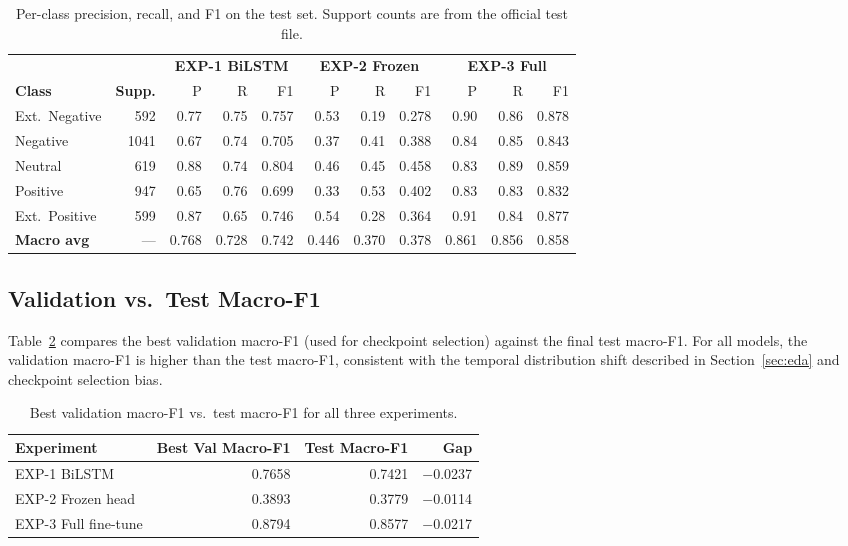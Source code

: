 \begin{table}[H]
    \centering
    \caption{Per-class precision, recall, and F1 on the test set. Support counts are from the official test file.}
    \label{tab:perclass_results}
    \begin{tabularx}{\textwidth}{l r | r r r | r r r | r r r}
        \toprule
        & & \multicolumn{3}{c|}{\textbf{EXP-1 BiLSTM}} & \multicolumn{3}{c|}{\textbf{EXP-2 Frozen}} & \multicolumn{3}{c}{\textbf{EXP-3 Full}} \\
        \textbf{Class} & \textbf{Supp.} & P & R & F1 & P & R & F1 & P & R & F1 \\
        \midrule
        Ext.\ Negative  & 592  & 0.77 & 0.75 & 0.757 & 0.53 & 0.19 & 0.278 & 0.90 & 0.86 & 0.878 \\
        Negative        & 1041 & 0.67 & 0.74 & 0.705 & 0.37 & 0.41 & 0.388 & 0.84 & 0.85 & 0.843 \\
        Neutral         & 619  & 0.88 & 0.74 & 0.804 & 0.46 & 0.45 & 0.458 & 0.83 & 0.89 & 0.859 \\
        Positive        & 947  & 0.65 & 0.76 & 0.699 & 0.33 & 0.53 & 0.402 & 0.83 & 0.83 & 0.832 \\
        Ext.\ Positive  & 599  & 0.87 & 0.65 & 0.746 & 0.54 & 0.28 & 0.364 & 0.91 & 0.84 & 0.877 \\
        \midrule
        \textbf{Macro avg} & --- & 0.768 & 0.728 & 0.742 & 0.446 & 0.370 & 0.378 & 0.861 & 0.856 & 0.858 \\
        \bottomrule
    \end{tabularx}
\end{table}

\subsection{Validation vs.\ Test Macro-F1}

Table~\ref{tab:val_vs_test} compares the best validation macro-F1 (used for checkpoint selection) against the final test macro-F1. For all models, the validation macro-F1 is higher than the test macro-F1, consistent with the temporal distribution shift described in Section~\ref{sec:eda} and checkpoint selection bias.

\begin{table}[H]
    \centering
    \caption{Best validation macro-F1 vs.\ test macro-F1 for all three experiments.}
    \label{tab:val_vs_test}
    \begin{tabularx}{\textwidth}{l r r r}
        \toprule
        \textbf{Experiment} & \textbf{Best Val Macro-F1} & \textbf{Test Macro-F1} & \textbf{Gap} \\
        \midrule
        EXP-1 BiLSTM         & 0.7658 & 0.7421 & $-$0.0237 \\
        EXP-2 Frozen head    & 0.3893 & 0.3779 & $-$0.0114 \\
        EXP-3 Full fine-tune & 0.8794 & 0.8577 & $-$0.0217 \\
        \bottomrule
    \end{tabularx}
\end{table}

